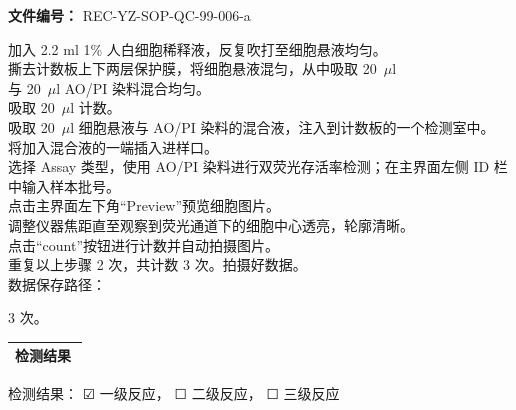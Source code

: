 \documentclass[UTF8,10pt,a4paper,fontset=fandol]{ctexart}
\newcommand{\fieldvalue}[1]{#1}
\newcommand{\handwritten}[1]{#1}
\newcommand{\checkboxfield}[1]{\ifstrequal{#1}{checked}{☑}{\ifstrequal{#1}{unclear}{?}{☐}}}
\begin{document}
\newpage

\noindent
\textbf{文件编号：} REC-YZ-SOP-QC-99-006-a

\vspace{0.5em}

\noindent
加入 2.2 ml 1\% 人白细胞稀释液，反复吹打至细胞悬液均匀。\\
撕去计数板上下两层保护膜，将细胞悬液混匀，从中吸取 20~$\mu$l\\
与 20~$\mu$l AO/PI 染料混合均匀。\\
吸取
\fieldvalue{\handwritten{20}}~$\mu$l 计数。\\
吸取 20~$\mu$l 细胞悬液与 AO/PI 染料的混合液，注入到计数板的一个检测室中。\\
将加入混合液的一端插入进样口。\\
选择 Assay 类型，使用 AO/PI 染料进行双荧光存活率检测；在主界面左侧 ID 栏中输入样本批号。\\
点击主界面左下角“Preview”预览细胞图片。\\
调整仪器焦距直至观察到荧光通道下的细胞中心透亮，轮廓清晰。\\
点击“count”按钮进行计数并自动拍摄图片。\\
重复以上步骤 2 次，共计数 3 次。拍摄好数据。\\
数据保存路径：

\noindent
\fieldvalue{\handwritten{3}} 次。

\vspace{0.5em}

\noindent
\begin{tabular}{|p{0.95\linewidth}|}
\hline
\centering 检测结果\tabularnewline
\hline
\end{tabular}

\noindent
检测结果：
\fieldvalue{\checkboxfield{checked}} 一级反应，
\fieldvalue{\checkboxfield{unchecked}} 二级反应，
\fieldvalue{\checkboxfield{unchecked}} 三级反应

\vspace{0.3em}
\end{document}
